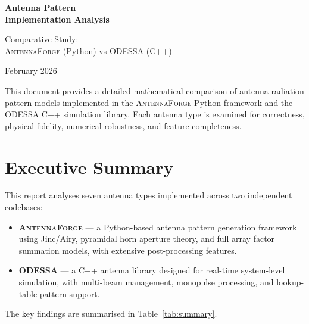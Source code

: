 \documentclass[11pt,a4paper]{article}
\newcommand{\AF}{\textsc{AntennaForge}}
\newcommand{\OD}{\textsc{ODESSA}}
\begin{document}
\begin{titlepage}
\centering
\vspace*{3cm}
{\Huge\bfseries\color{sectionblue} Antenna Pattern\\[0.3em]
Implementation Analysis\par}
\vspace{1.5cm}
{\Large Comparative Study:\\[0.3em]
\AF{} (Python) vs \OD{} (C++)\par}
\vspace{2cm}
{\large February 2026\par}
\vfill
{\small
This document provides a detailed mathematical comparison of antenna
radiation pattern models implemented in the \AF{} Python framework
and the \OD{} C++ simulation library. Each antenna type is examined
for correctness, physical fidelity, numerical robustness, and
feature completeness.\par}
\vspace{1cm}
\end{titlepage}

\tableofcontents
\newpage

\section{Executive Summary}

This report analyses seven antenna types implemented across two independent codebases:

\begin{itemize}[leftmargin=2em]
  \item \textbf{\AF{}} --- a Python-based antenna pattern generation framework using
        Jinc/Airy, pyramidal horn aperture theory, and full array factor
        summation models, with extensive post-processing features.
  \item \textbf{\OD{}} --- a C++ antenna library designed for real-time system-level
        simulation, with multi-beam management, monopulse processing, and
        lookup-table pattern support.
\end{itemize}

\noindent The key findings are summarised in Table~\ref{tab:summary}.
\end{document}
